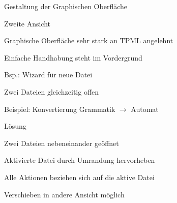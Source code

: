 



{
    \begin{itemgroup}{}
	\item Gestaltung der Graphischen Oberfläche
	\item Zweite Ansicht
	\end{itemgroup}
  
	\vfill{}
}


{
    \begin{itemgroup}{}
	\item Graphische Oberfläche sehr stark an TPML angelehnt
	\item Einfache Handhabung steht im Vordergrund
		\begin{itemgroup}{}
		\item Bsp.: Wizard für neue Datei
		\end{itemgroup}	
	\end{itemgroup}
  
	\vfill{}
}


{
    \begin{itemgroup}{}
	\item Zwei Dateien gleichzeitig offen
	\item Beispiel: Konvertierung Grammatik $\to$ Automat
    \end{itemgroup}

    \begin{itemgroup}{Lösung}
	\item Zwei Dateien nebeneinander geöffnet
	\item Aktivierte Datei durch Umrandung hervorheben
	\item Alle Aktionen beziehen sich auf die aktive Datei
	\item Verschieben in andere Ansicht möglich
	\end{itemgroup}
    
    \vfill{}
}


